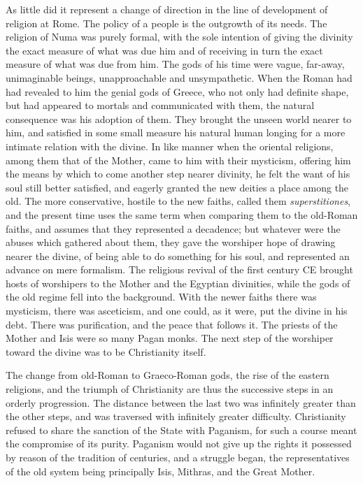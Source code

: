 \documentclass[a4paper, 11pt, oneside, polutonikogreek, french]{article}
\begin{document}
As little did it represent a change of direction in the line of development of religion at Rome. The policy of a people is the outgrowth of its needs. The religion of Numa was purely formal, with the sole intention of giving the divinity the exact measure of what was due him and of receiving in turn the exact measure of what was due from him. The gods of his time were vague, far-away, unimaginable beings, unapproachable and unsympathetic. When the Roman had had revealed to him the genial gods of Greece, who not only had definite shape, but had appeared to mortals and communicated with them, the natural consequence was his adoption of them. They brought the unseen world nearer to him, and satisfied in some small measure his natural human longing for a more intimate relation with the divine. In like manner when the oriental religions, among them that of the Mother, came to him with their mysticism, offering him the means by which to come another step nearer divinity, he felt the want of his soul still better satisfied, and eagerly granted the new deities a place among the old. The more conservative, hostile to the new faiths, called them \emph{superstitiones}, and the present time uses the same term when comparing them to the old-Roman faiths, and assumes that they represented a decadence; but whatever were the abuses which gathered about them, they gave the worshiper hope of drawing nearer the divine, of being able to do something for his soul, and represented an advance on mere formalism. The religious revival of the first century \textsc{CE} brought hosts of worshipers to the Mother and the Egyptian divinities, while the gods of the old regime fell into the background. With the newer faiths there was mysticism, there was asceticism, and one could, as it were, put the divine in his debt. There was purification, and the peace that follows it. The priests of the Mother and Isis were so many Pagan monks. The next step of the worshiper toward the divine was to be Christianity itself.

The change from old-Roman to Graeco-Roman gods, the rise of the eastern religions, and the triumph of Christianity are thus the successive steps in an orderly progression. The distance between the last two was infinitely greater than the other steps, and was traversed with infinitely greater difficulty. Christianity refused to share the sanction of the State with Paganism, for such a course meant the compromise of its purity. Paganism would not give up the rights it possessed by reason of the tradition of centuries, and a struggle began, the representatives of the old system being principally Isis, Mithras, and the Great Mother.
\end{document}
